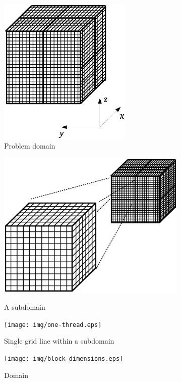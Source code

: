 \documentclass{article}
\begin{document}
    \begin{figure}[h]
    \begin{center}
    \includegraphics[trim={{100pt} {150pt} {100pt} {150pt}}, clip, height=200pt]{img/domain.eps}
    \end{center}
    \caption{Problem domain}
    \label{fig:domain}
    \end{figure}
    \begin{figure}[ht]
    \begin{minipage}[b]{0.40\linewidth}
    \begin{center}
    \includegraphics[trim={{100pt} {150pt} {100pt} {150pt}}, clip, height=200pt]{img/one-block.eps}
    \end{center}
    \caption{A subdomain}
    \label{fig:block}
    \end{minipage}
    \hspace{0.5cm}
    \begin{minipage}[b]{0.40\linewidth}
    \begin{center}
    \texttt{[image: img/one-thread.eps]}
    \end{center}
    \caption{Single grid line within a subdomain}
    \label{fig:grid-line}
    \end{minipage}
    \end{figure}
    \begin{figure}[h]
    \begin{center}
    \texttt{[image: img/block-dimensions.eps]}
    \end{center}
    \caption{Domain}
    \label{fig:block-dimensions}
    \end{figure}
\end{document}

